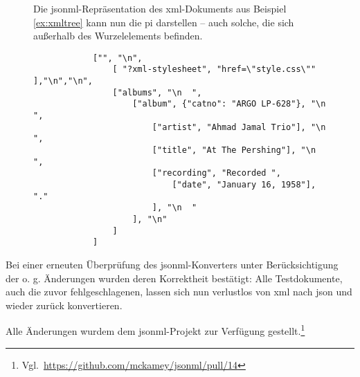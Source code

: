 \begin{figure}[h!]
    \begin{example}[\glspl{pi}] Die \acrshort{jsonml}-Repräsentation des \acrshort{xml}-Dokuments aus Beispiel \ref{ex:xmltree} kann nun die \gls{pi} darstellen -- auch solche, die sich außerhalb des Wurzelelements befinden.
        \begin{verbatim}
            ["", "\n",
                [ "?xml-stylesheet", "href=\"style.css\"" ],"\n","\n",
                ["albums", "\n  ",
                    ["album", {"catno": "ARGO LP-628"}, "\n    ",
                        ["artist", "Ahmad Jamal Trio"], "\n    ",
                        ["title", "At The Pershing"], "\n    ",
                        ["recording", "Recorded ",
                            ["date", "January 16, 1958"], "."
                        ], "\n  "
                    ], "\n"
                ]
            ]
        \end{verbatim}
    \end{example}
\end{figure}

Bei einer erneuten Überprüfung des \acrshort{jsonml}-Konverters unter Berücksichtigung der o. g. Änderungen wurden deren Korrektheit bestätigt: Alle Testdokumente, auch die zuvor fehlgeschlagenen, lassen sich nun verlustlos von \acrshort{xml} nach \acrshort{json} und wieder zurück konvertieren.

Alle Änderungen wurdem dem \acrshort{jsonml}-Projekt zur Verfügung gestellt.\footnote{Vgl.~\url{https://github.com/mckamey/jsonml/pull/14}}
